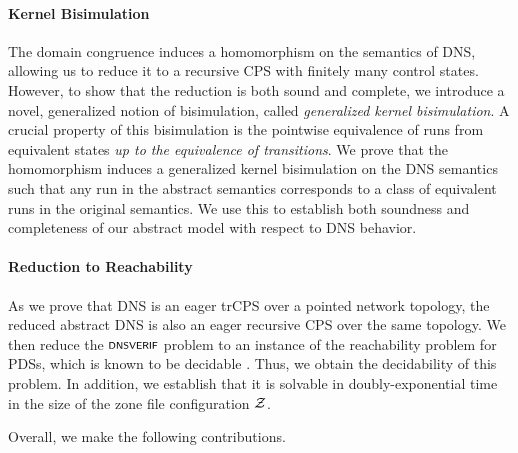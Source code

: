 \paragraph{Kernel Bisimulation}
The domain congruence induces a homomorphism on the semantics
of DNS, allowing us to reduce it to a recursive CPS with  finitely many control states. However, to show that the reduction is both sound and complete, we introduce a novel,  generalized notion of bisimulation, called \emph{generalized kernel bisimulation}. A crucial property of this bisimulation is the pointwise equivalence of runs from equivalent states \emph{up to the equivalence of transitions}. We prove that the homomorphism induces a generalized kernel bisimulation on the DNS semantics such that any run in the abstract semantics corresponds to a class of equivalent runs in the original semantics. 
We use this to establish both soundness and completeness of our abstract model with respect to DNS behavior.

\paragraph{Reduction to Reachability}
As we prove that DNS is an eager trCPS over a pointed network topology,
the reduced abstract DNS is also an eager recursive CPS over the same topology. %
We then reduce the $\scrsf{dnsverif}$ problem to an instance of the reachability problem for PDSs, which is known to be decidable \cite{bouajjani1997reachability}.
Thus, we obtain the decidability of this problem. In addition, we establish that it is solvable in doubly-exponential time in the size of the zone file configuration $\cal Z$.




























 Overall, we make the following  contributions.

